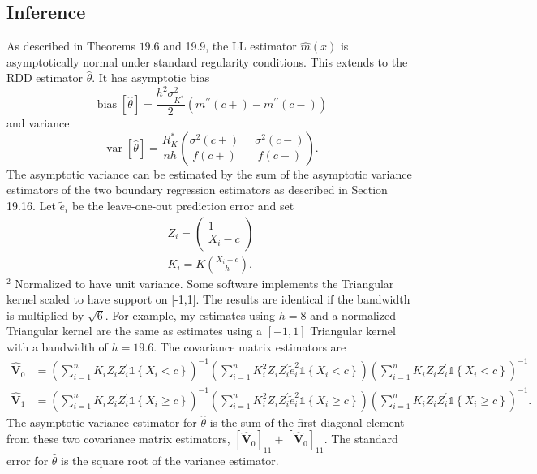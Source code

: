 \documentclass[10pt]{article}
\begin{document}
\subsection{Inference}
As described in Theorems $19.6$ and 19.9, the LL estimator $\widehat{m}(x)$ is asymptotically normal under standard regularity conditions. This extends to the RDD estimator $\widehat{\theta}$. It has asymptotic bias
$$
\operatorname{bias}[\widehat{\theta}]=\frac{h^{2} \sigma_{K^{*}}^{2}}{2}\left(m^{\prime \prime}(c+)-m^{\prime \prime}(c-)\right)
$$
and variance
$$
\operatorname{var}[\widehat{\theta}]=\frac{R_{K}^{*}}{n h}\left(\frac{\sigma^{2}(c+)}{f(c+)}+\frac{\sigma^{2}(c-)}{f(c-)}\right) .
$$
The asymptotic variance can be estimated by the sum of the asymptotic variance estimators of the two boundary regression estimators as described in Section 19.16. Let $\widetilde{e}_{i}$ be the leave-one-out prediction error and set
$$
\begin{gathered}
Z_{i}=\left(\begin{array}{c}
1 \\
X_{i}-c
\end{array}\right) \\
K_{i}=K\left(\frac{X_{i}-c}{h}\right) .
\end{gathered}
$$
${ }^{2}$ Normalized to have unit variance. Some software implements the Triangular kernel scaled to have support on [-1,1]. The results are identical if the bandwidth is multiplied by $\sqrt{6}$. For example, my estimates using $h=8$ and a normalized Triangular kernel are the same as estimates using a $[-1,1]$ Triangular kernel with a bandwidth of $h=19.6$. The covariance matrix estimators are
$$
\begin{aligned}
\widehat{\boldsymbol{V}}_{0} &=\left(\sum_{i=1}^{n} K_{i} Z_{i} Z_{i}^{\prime} \mathbb{1}\left\{X_{i}<c\right\}\right)^{-1}\left(\sum_{i=1}^{n} K_{i}^{2} Z_{i} Z_{i}^{\prime} \widetilde{e}_{i}^{2} \mathbb{1}\left\{X_{i}<c\right\}\right)\left(\sum_{i=1}^{n} K_{i} Z_{i} Z_{i}^{\prime} \mathbb{1}\left\{X_{i}<c\right\}\right)^{-1} \\
\widehat{\boldsymbol{V}}_{1} &=\left(\sum_{i=1}^{n} K_{i} Z_{i} Z_{i}^{\prime} \mathbb{1}\left\{X_{i} \geq c\right\}\right)^{-1}\left(\sum_{i=1}^{n} K_{i}^{2} Z_{i} Z_{i}^{\prime} \widetilde{e}_{i}^{2} \mathbb{1}\left\{X_{i} \geq c\right\}\right)\left(\sum_{i=1}^{n} K_{i} Z_{i} Z_{i}^{\prime} \mathbb{1}\left\{X_{i} \geq c\right\}\right)^{-1} .
\end{aligned}
$$
The asymptotic variance estimator for $\widehat{\theta}$ is the sum of the first diagonal element from these two covariance matrix estimators, $\left[\widehat{\boldsymbol{V}}_{0}\right]_{11}+\left[\widehat{\boldsymbol{V}}_{0}\right]_{11}$. The standard error for $\hat{\theta}$ is the square root of the variance estimator.
\end{document}
